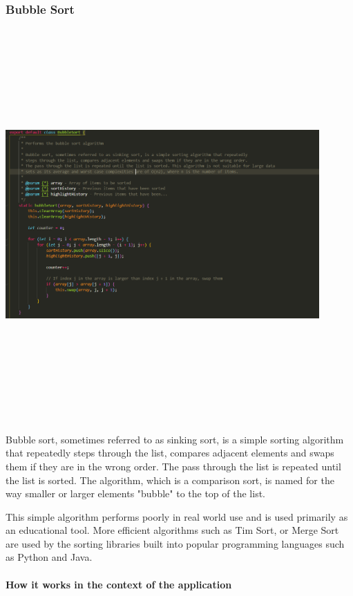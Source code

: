 \subsubsection{Bubble Sort}
\begin{center}
    \includegraphics[width=12cm,height=15cm,keepaspectratio]{images/bubblesort}
\end{center}
Bubble sort, sometimes referred to as sinking sort, is a simple sorting algorithm that repeatedly steps through the list, compares adjacent elements and swaps them if they are in the wrong order. The pass through the list is repeated until the list is sorted. The algorithm, which is a comparison sort, is named for the way smaller or larger elements "bubble" to the top of the list.
\par
\bigskip
This simple algorithm performs poorly in real world use and is used primarily as an educational tool. More efficient algorithms such as Tim Sort, or Merge Sort are used by the sorting libraries built into popular programming languages such as Python and Java.

\paragraph{How it works in the context of the application}


